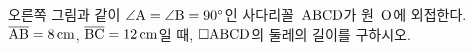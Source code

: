 \noindent\begin{minipage}[t]{0.58\linewidth}\vspace{0pt}\raggedright 오른쪽 그림과 같이 $\angle\mathrm{A}=\angle\mathrm{B}=90^\circ$인 사다리꼴~$\mathrm{ABCD}$가 원~$\mathrm{O}$에 외접한다. $\overline{\mathrm{AB}}=8\,\mathrm{cm}$, $\overline{\mathrm{BC}}=12\,\mathrm{cm}$일 때, $\square\mathrm{ABCD}$의 둘레의 길이를 구하시오.\end{minipage}\hfill\begin{minipage}[t]{0.4\linewidth}\vspace{0pt}\centering \resizebox{\ifdim\width>\linewidth\linewidth\else\width\fi}{!}{}\end{minipage}\par
